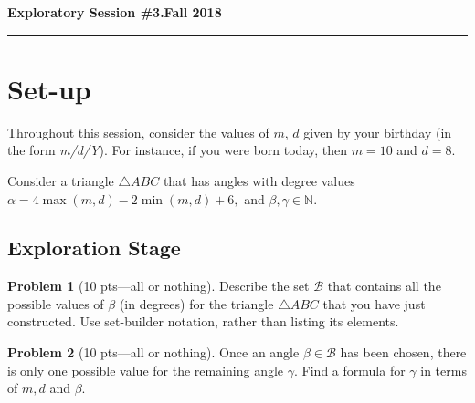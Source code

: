 \documentclass[11pt]{article}
\theoremstyle{definition}
\newtheorem{problem}{Problem}
\theoremstyle{theorem}
\begin{document}
\hfill{\large\bf Exploratory Session \#3.}\hfill{\large\bf  Fall 2018}\hrule

\section*{Set-up}
Throughout this session, consider the values of $m$, $d$ given by your birthday (in the form \emph{m/d/Y}).  For
instance, if you were born today, then $m=10$ and $d=8$.

Consider a triangle $\triangle ABC$ that has angles with degree values $\alpha = 4\max(m,d)-2\min(m,d)+6,$ and
$\beta, \gamma \in \mathbb{N}$.

\begin{center}
\end{center}

\subsection*{Exploration Stage}
\begin{problem}[10 pts---all or nothing] 
  Describe the set $\mathcal{B}$ that contains all the possible values of $\beta$ (in degrees) for the triangle
  $\triangle ABC$ that you have just constructed.  Use set-builder notation, rather than listing its elements.
\end{problem}

\begin{problem}[10 pts---all or nothing]
  Once an angle $\beta \in \mathcal{B}$ has been chosen, there is only one possible value for the remaining angle
  $\gamma$.  Find a formula for $\gamma$ in terms of $m, d$ and $\beta$.
\end{problem}
\end{document}
